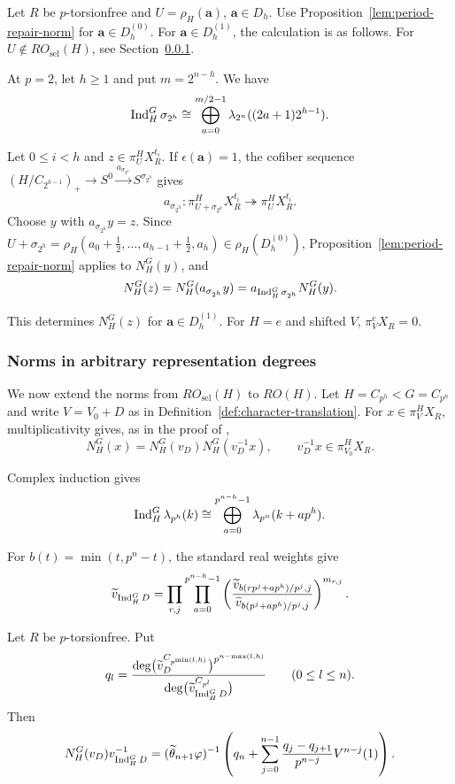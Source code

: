 Let $R$ be $p$-torsionfree and $U=\rho_H(\mathbf a)$, $\mathbf a\in D_h$.
Use Proposition~\ref{lem:period-repair-norm} for $\mathbf a\in D_h^{(0)}$.
For $\mathbf a\in D_h^{(1)}$, the calculation is as follows.
For $U\notin RO_{\mathrm{sel}}(H)$, see Section~\ref{subsubsec:arbitrary-degree-norms}.

At $p=2$, let $h\ge1$ and put $m=2^{n-h}$. We have
\[
\operatorname{Ind}_H^G\sigma_{2^h}
\cong\bigoplus_{a=0}^{m/2-1}
\lambda_{2^n}((2a+1)2^{h-1}).
\]

Let $0\le i<h$ and $z\in\pi_U^H X_R^{t_i}$.
If $\epsilon(\mathbf a)=1$, the cofiber sequence
$
(H/C_{2^{h-1}})_+\longrightarrow S^0
\xrightarrow{a_{\sigma_{2^h}}}S^{\sigma_{2^h}}
$
gives
\[
a_{\sigma_{2^h}}:\pi_{U+\sigma_{2^h}}^H X_R^{t_i}
\twoheadrightarrow\pi_U^H X_R^{t_i}.
\]
Choose $y$ with $a_{\sigma_{2^h}}y=z$. Since
$U+\sigma_{2^h}=\rho_H(a_0+\tfrac12,\ldots,a_{h-1}+\tfrac12,a_h)
\in\rho_H(D_h^{(0)})$,
Proposition~\ref{lem:period-repair-norm} applies to $N_H^G(y)$, and
\[
N_H^G(z)
=N_H^G(a_{\sigma_{2^h}}y)
=a_{\operatorname{Ind}_H^G\sigma_{2^h}}N_H^G(y).
\]

This determines $N_H^G(z)$ for $\mathbf a\in D_h^{(1)}$. For $H=e$ and shifted $V$, $\pi_V^eX_R=0$.

\subsubsection{Norms in arbitrary representation degrees}
\label{subsubsec:arbitrary-degree-norms}
We now extend the norms from $RO_{\mathrm{sel}}(H)$ to $RO(H)$.
Let $H=C_{p^h}<G=C_{p^n}$ and write $V=V_0+D$ as in
Definition~\ref{def:character-translation}.
For $x\in\pi_V^H X_R$, multiplicativity gives, as in the proof of
\cite[Proposition~8.29]{ZhangHZ},
\[
N_H^G(x)=N_H^G(v_D)N_H^G(v_D^{-1}x),
\qquad v_D^{-1}x\in\pi_{V_0}^H X_R.
\]

Complex induction gives
\begin{equation*}
\operatorname{Ind}_H^G\lambda_{p^h}(k)
\cong\bigoplus_{a=0}^{p^{n-h}-1}
\lambda_{p^n}(k+ap^h).
\end{equation*}


For $b(t)=\min(t,p^n-t)$, the standard real weights give
\[
\widetilde v_{\operatorname{Ind}_H^G D}
=\prod_{r,j}\prod_{a=0}^{p^{n-h}-1}
\left(
\frac{\widetilde v_{b(rp^j+ap^h)/p^j,j}}
     {\widetilde v_{b(p^j+ap^h)/p^j,j}}
\right)^{m_{r,j}}.
\]

\begin{proposition}\label{lem:ordered-sign-units}
Let $R$ be $p$-torsionfree. Put
\[
q_l=
\frac{
\deg\bigl(\widetilde v_D^{C_{p^{\min(l,h)}}}\bigr)^{
p^{n-\max(l,h)}}}
{\deg\bigl(\widetilde v_{\operatorname{Ind}_H^G D}^{C_{p^l}}\bigr)}
\qquad(0\le l\le n).
\]
Then
\begin{equation*}
N_H^G(v_D)v_{\operatorname{Ind}_H^G D}^{-1}
=
(\widetilde\theta_{n+1}\varphi)^{-1}
\left(
q_n+\sum_{j=0}^{n-1}
\frac{q_j-q_{j+1}}{p^{n-j}}V^{n-j}(1)
\right).
\end{equation*}
\end{proposition}

